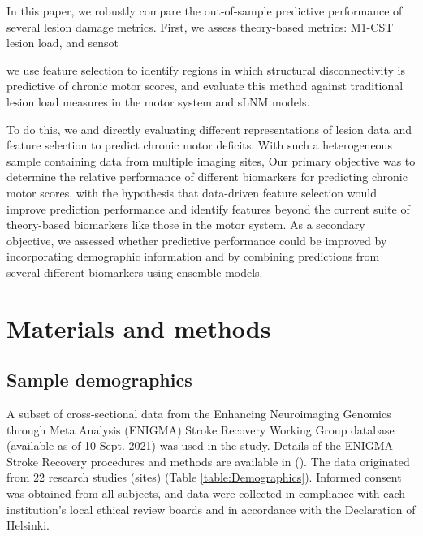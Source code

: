 \documentclass[10pt]{article}
\begin{document}
In this paper, we robustly compare the out-of-sample predictive performance of several lesion damage metrics. First, we assess theory-based metrics: M1-CST lesion load, and sensot


we use feature selection to identify regions in which structural disconnectivity is predictive of chronic motor scores, and evaluate this method against traditional lesion load measures in the motor system and sLNM models.

To do this, we and directly evaluating different representations of lesion data and feature selection to predict chronic motor deficits. With such a heterogeneous sample containing data from multiple imaging sites, Our primary objective was to determine the relative performance of different biomarkers for predicting chronic motor scores, with the hypothesis that data-driven feature selection would improve prediction performance and identify features beyond the current suite of theory-based biomarkers like those in the motor system. As a secondary objective, we assessed whether predictive performance could be improved by incorporating demographic information and by combining predictions from several different biomarkers using ensemble models.

\section{Materials and methods}
\subsection{Sample demographics}
A subset of cross‐sectional data from the Enhancing Neuroimaging Genomics through Meta Analysis (ENIGMA) Stroke Recovery Working Group database (available as of 10 Sept. 2021) was used in the study. Details of the ENIGMA Stroke Recovery procedures and methods are available in (\cite{Liew2020-ps}). The data originated from 22 research studies (sites) (Table \ref{table:Demographics}). Informed consent was obtained from all subjects, and data were collected in compliance with each institution’s local ethical review boards and in accordance with the Declaration of Helsinki.
\end{document}

